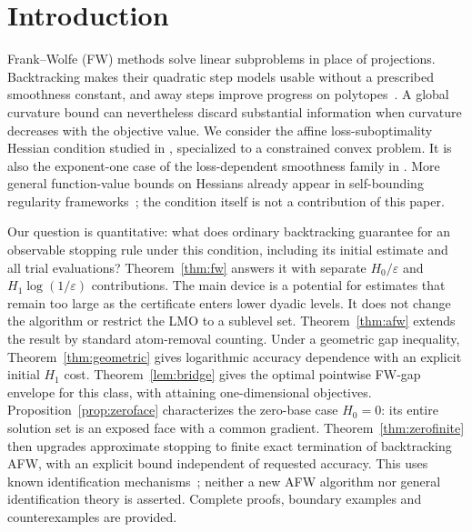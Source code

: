 \section{Introduction}
Frank--Wolfe (FW) methods solve linear subproblems in place of
projections. Backtracking makes their quadratic step models usable
without a prescribed smoothness constant, and away steps improve
progress on polytopes~\cite{braun,pedregosa,lacostejaggi}.
A global curvature bound can nevertheless discard substantial
information when curvature decreases with the objective value.
We consider the affine loss-suboptimality Hessian condition studied in
\cite{warmup}, specialized to a constrained convex problem. It is also
the exponent-one case of the loss-dependent smoothness family in
\cite{liuwarmup}. More general
function-value bounds on Hessians already appear in self-bounding
regularity frameworks~\cite{kale,caoselfbound}; the condition itself is
not a contribution of this paper.

Our question is quantitative: what does ordinary backtracking guarantee
for an observable stopping rule under this condition, including its
initial estimate and all trial evaluations? Theorem~\ref{thm:fw}
answers it with separate $H_0/\varepsilon$ and $H_1\log(1/\varepsilon)$
contributions. The main device is a potential for estimates that remain
too large as the certificate enters lower dyadic levels. It does not
change the algorithm or restrict the LMO to a sublevel set.
Theorem~\ref{thm:afw} extends the result by standard atom-removal
counting. Under a geometric gap inequality,
Theorem~\ref{thm:geometric} gives logarithmic accuracy dependence with
an explicit initial $H_1$ cost. Theorem~\ref{lem:bridge} gives the
optimal pointwise FW-gap envelope for this class, with attaining
one-dimensional objectives. Proposition~\ref{prop:zeroface} characterizes
the zero-base case $H_0=0$: its entire solution set is an exposed face
with a common gradient. Theorem~\ref{thm:zerofinite} then upgrades
approximate stopping to finite exact termination of backtracking AFW,
with an explicit bound independent of requested accuracy. This uses
known identification mechanisms~\cite{bomze,garber}; neither a new AFW
algorithm nor general identification theory is asserted.
Complete proofs, boundary examples and counterexamples are provided.


